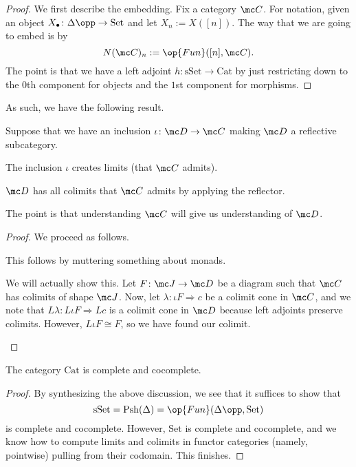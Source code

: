 \begin{proof}
	We first describe the embedding. Fix a category $\mc C$. For notation, given an object $X_\bullet\colon\Delta\opp\to\mathrm{Set}$ and let $X_n:=X([n])$. The way that we are going to embed is by
	\[N(\mc C)_n:=\op{Fun}([n],\mc C).\]
	The point is that we have a left adjoint $h\colon\mathrm{sSet}\to\mathrm{Cat}$ by just restricting down to the $0$th component for objects and the $1$st component for morphisms.
\end{proof}
As such, we have the following result.
\begin{proposition}
	Suppose that we have an inclusion $\iota\colon\mc D\to\mc C$ making $\mc D$ a reflective subcategory.
	\begin{listroman}
		\item The inclusion $\iota$ creates limits (that $\mc C$ admits).
		\item $\mc D$ has all colimits that $\mc C$ admits by applying the reflector.
	\end{listroman}
\end{proposition}
The point is that understanding $\mc C$ will give us understanding of $\mc D$.
\begin{proof}
	We proceed as follows.
	\begin{listroman}
		\item This follows by muttering something about monads.
		\item We will actually show this. Let $F\colon\mc J\to\mc D$ be a diagram such that $\mc C$ has colimits of shape $\mc J$. Now, let $\lambda\colon \iota F\Rightarrow c$ be a colimit cone in $\mc C$, and we note that $L\lambda\colon L\iota F\Rightarrow Lc$ is a colimit cone in $\mc D$ because left adjoints preserve colimits. However, $L\iota F\cong F$, so we have found our colimit.
		\qedhere
	\end{listroman}
\end{proof}
\begin{corollary}
	The category $\mathrm{Cat}$ is complete and cocomplete.
\end{corollary}
\begin{proof}
	By synthesizing the above discussion, we see that it suffices to show that
	\[\mathrm{sSet}=\mathrm{Psh}(\Delta)=\op{Fun}(\Delta\opp,\mathrm{Set})\]
	is complete and cocomplete. However, $\mathrm{Set}$ is complete and cocomplete, and we know how to compute limits and colimits in functor categories (namely, pointwise) pulling from their codomain. This finishes.
\end{proof}